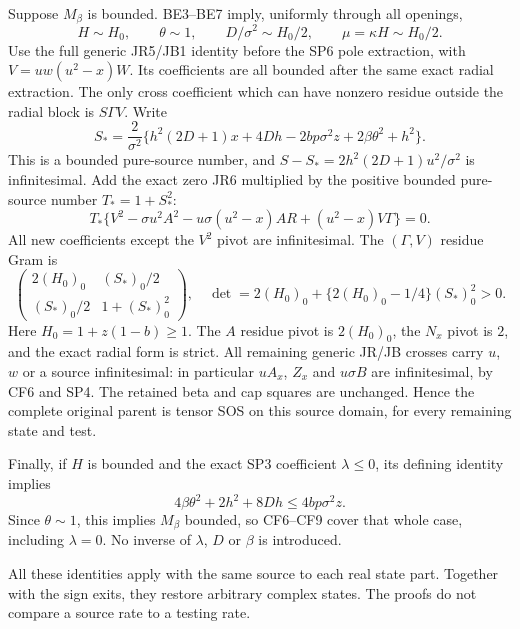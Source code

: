 Suppose $M_\beta$ is bounded. BE3--BE7 imply, uniformly through
all openings,
\[
 H\sim H_0,\qquad \theta\sim1,\qquad
 D/\sigma^2\sim H_0/2,\qquad \mu=\kappa H\sim H_0/2.
                                                               \tag{CF6}
\]
Use the full generic JR5/JB1 identity before the SP6 pole extraction,
with $V=uw(u^2-x)W$. Its coefficients are all bounded after the
same exact radial extraction. The only cross coefficient which can
have nonzero residue outside the radial block is $S\Gamma V$.
Write
\[
 S_*=\frac{2}{\sigma^2}
 \{h^2(2D+1)x+4Dh-2bp\sigma^2z
                         +2\beta\theta^2+h^2\}.
                                                               \tag{CF7}
\]
This is a bounded pure-source number, and
$S-S_*=2h^2(2D+1)u^2/\sigma^2$ is infinitesimal.
Add the exact zero JR6 multiplied by the positive bounded
pure-source number $T_*=1+S_*^2$:
\[
 T_*\{V^2-\sigma u^2A^2
       -u\sigma(u^2-x)AR+(u^2-x)V\Gamma\}=0.        \tag{CF8}
\]
All new coefficients except the $V^2$ pivot are infinitesimal.
The $(\Gamma,V)$ residue Gram is
\[
 \begin{pmatrix}
 2(H_0)_0&(S_*)_0/2\\
 (S_*)_0/2&1+(S_*)_0^2
 \end{pmatrix},
\quad
 \det=2(H_0)_0+
          \{2(H_0)_0-1/4\}(S_*)_0^2>0.              \tag{CF9}
\]
Here $H_0=1+z(1-b)\ge1$. The $A$ residue pivot is $2(H_0)_0$,
the $N_x$ pivot is $2$, and the exact radial form is strict.
All remaining generic JR/JB crosses carry $u$, $w$ or a source
infinitesimal: in particular $uA_x$, $Z_x$ and $u\sigma B$ are
infinitesimal, by CF6 and SP4. The retained beta and cap squares
are unchanged. Hence the complete original parent is tensor SOS
on this source domain, for every remaining state and test.

Finally, if $H$ is bounded and the exact SP3 coefficient $\lambda\le0$,
its defining identity implies
\[
 4\beta\theta^2+2h^2+8Dh\le4bp\sigma^2z.
\]
Since $\theta\sim1$, this implies $M_\beta$ bounded, so CF6--CF9
cover that whole case, including $\lambda=0$. No inverse of
$\lambda$, $D$ or $\beta$ is introduced.

All these identities apply with the same source to each real state
part. Together with the sign exits, they restore arbitrary complex
states. The proofs do not compare a source rate to a testing rate.
